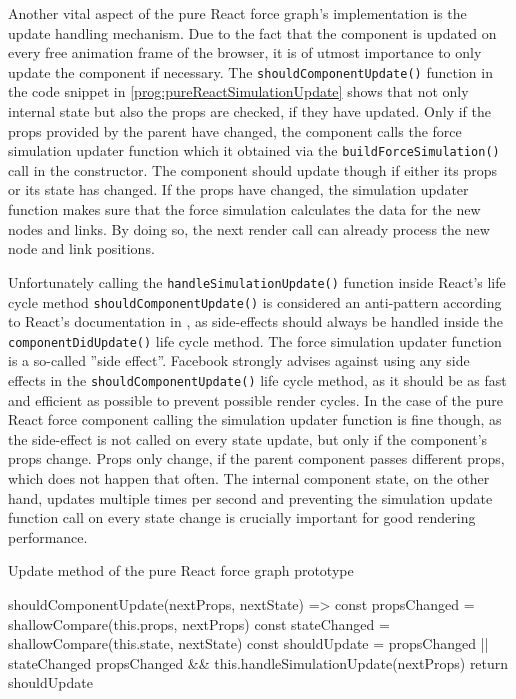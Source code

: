 Another vital aspect of the pure React force graph's implementation is the update handling mechanism. Due to the fact that the component is updated on every free animation frame of the browser, it is of utmost importance to only update the component if necessary. The \texttt{shouldComponentUpdate()} function in the code snippet in \ref{prog:pureReactSimulationUpdate} shows that not only internal state but also the props are checked, if they have updated. Only if the props provided by the parent have changed, the component calls the force simulation updater function which it obtained via the \texttt{buildForceSimulation()} call in the constructor. The component should update though if either its props or its state has changed. If the props have changed, the simulation updater function makes sure that the force simulation calculates the data for the new nodes and links. By doing so, the next render call can already process the new node and link positions.

Unfortunately calling the \texttt{handleSimulationUpdate()} function inside React's life cycle method \texttt{shouldComponentUpdate()} is considered an anti-pattern according to React's documentation in \cite[/docs/react-component.html]{React}, as side-effects should always be handled inside the \texttt{componentDidUpdate()} life cycle method. The force simulation updater function is a so-called ''side effect''. Facebook strongly advises against using any side effects in the \texttt{shouldComponentUpdate()} life cycle method, as it should be as fast and efficient as possible to prevent possible render cycles. In the case of the pure React force component calling the simulation updater function is fine though, as the side-effect is not called on every state update, but only if the component's props change. Props only change, if the parent component passes different props, which does not happen that often. The internal component state, on the other hand, updates multiple times per second and preventing the simulation update function call on every state change is crucially important for good rendering performance.

\begin{program}
\caption{Update method of the pure React force graph prototype}
\label{prog:pureReactSimulationUpdate}
\begin{JsCode}
shouldComponentUpdate(nextProps, nextState) => {
  const propsChanged = shallowCompare(this.props, nextProps)
  const stateChanged = shallowCompare(this.state, nextState)
  const shouldUpdate = propsChanged || stateChanged
  propsChanged && this.handleSimulationUpdate(nextProps)
  return shouldUpdate
}
\end{JsCode}
\end{program}

